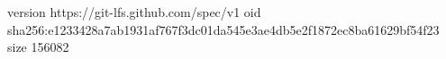 version https://git-lfs.github.com/spec/v1
oid sha256:e1233428a7ab1931af767f3dc01da545e3ae4db5e2f1872ec8ba61629bf54f23
size 156082
